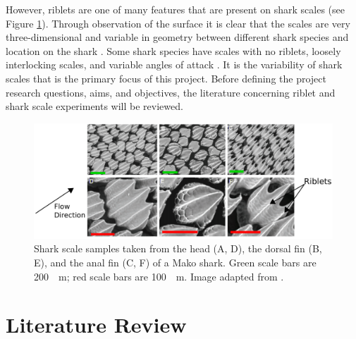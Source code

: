 \documentclass[12pt,oneside,a4paper]{article}
\begin{document}
However, riblets are one of many features that are present on shark scales (see Figure \ref{figure:scalesExample}). Through observation of the surface it is clear that the scales are very three-dimensional and variable in geometry between different shark species and location on the shark \citep{fletcher2014phd}. Some shark species have scales with no riblets, loosely interlocking scales, and variable angles of attack \citep{fletcher2014phd}. It is the variability of shark scales that is the primary focus of this project. Before defining the project research questions, aims, and objectives, the literature concerning riblet and shark scale experiments will be reviewed. 
\vspace{2cm}
%
\begin{figure}[!h]
\centering
\includegraphics[width=12cm]{images/Misc/makoScaleExample.png}
\caption{Shark scale samples taken from the head (A, D), the dorsal fin (B, E), and the anal fin (C, F) of a Mako shark. Green scale bars are \SI{200}{\mu m}; red scale bars are \SI{100}{\mu m}. Image adapted from \cite{wen2014}.}
\label{figure:scalesExample}
\end{figure}
%

\newpage
\section{Literature Review}
\label{section:literatureReview}
\end{document}
